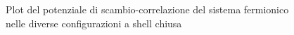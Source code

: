 \documentclass[11pt,a4paper]{article}
\begin{document}
\begin{figure}[!h]
\hspace{3mm}
\hspace{3mm}
\caption{Plot del potenziale di scambio-correlazione del sistema fermionico nelle diverse configurazioni a shell chiusa}
\end{figure}\ \\
\end{document}
